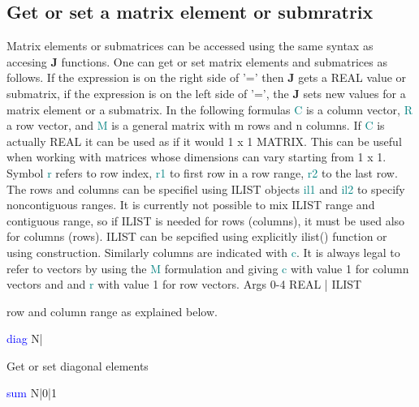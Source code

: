 \subsection{Get or set a matrix element or submratrix}
\label{getelem}
Matrix elements or submatrices can be accessed using the same syntax as
accesing \textbf{J} functions.
One can get or set matrix elements and submatrices as follows. If the expression
is on the right side of '=' then \textbf{J} gets a REAL value or submatrix, if the expression
is on the left side of '=', the \textbf{J} sets new values for a matrix element or a submatrix.
In the following formulas \textcolor{teal}{C} is a column vector, \textcolor{teal}{R} a row vector, and \textcolor{teal}{M} is
a general matrix with m rows and n columns.
If \textcolor{teal}{C} is actually REAL it can
be used as if it would 1 x 1 MATRIX. This can be useful when working with
matrices whose dimensions can vary starting from 1 x 1. Symbol \textcolor{teal}{r} refers to
row index, \textcolor{teal}{r1} to first row in a row range, \textcolor{teal}{r2} to the last row. The rows and
columns can be specifiel using ILIST objects \textcolor{teal}{il1} and \textcolor{teal}{il2} to specify noncontiguous ranges.
It is currently not possible to mix ILIST range and contiguous range, so if ILIST
is needed for rows (columns), it must be used also for columns (rows). ILIST can be
sepcified using explicitly \textcolor{VioletRed}{ilist}() function or using {} construction.
Similarly columns are indicated  with \textcolor{teal}{c}. It is always legal to refer to
vectors by using the \textcolor{teal}{M} formulation and giving \textcolor{teal}{c} with value 1 for column vectors and
and \textcolor{teal}{r} with value 1 for row vectors.
\vspace{0.3cm}
\hline
\vspace{0.3cm}
\noindent Args \tabto{3cm} 0-4 \tabto{5cm}  REAL | ILIST \tabto{7cm}
\begin{changemargin}{3cm}{0cm}
\noindent row and column range as explained below.
\end{changemargin}
\vspace{0.3cm}
\hline
\vspace{0.3cm}
\noindent \textcolor{blue}{diag} \tabto{3cm} N| \tabto{5cm}    \tabto{7cm}
\begin{changemargin}{3cm}{0cm}
\noindent Get or set diagonal elements
\end{changemargin}
\vspace{0.3cm}
\hline
\vspace{0.3cm}
\noindent \textcolor{blue}{sum} \tabto{3cm} N|0|1 \tabto{5cm}    \tabto{7cm}
